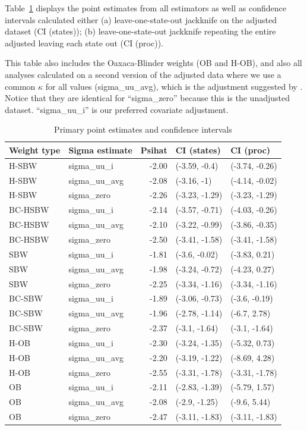 \documentclass[12pt]{article}
\begin{document}
Table~\ref{tab:confintmain} displays the point estimates from all estimators as well as confidence intervals calculated either (a) leave-one-state-out jackknife on the adjusted dataset (CI (states)); (b) leave-one-state-out jackknife repeating the entire adjusted leaving each state out (CI (proc)). 

This table also includes the Oaxaca-Blinder weights (OB and H-OB), and also all analyses calculated on a second version of the adjusted data where we use a common $\kappa$ for all values (sigma\_uu\_avg), which is the adjustment suggested by \cite{carroll2006measurement}. Notice that they are identical for ``sigma\_zero'' because this is the unadjusted dataset. ``sigma\_uu\_i'' is our preferred covariate adjustment.

\begin{table}[ht]
\centering
\begin{tabular}{llrll}
  \toprule
Weight type & Sigma estimate & Psihat & CI (states) & CI (proc) \\ 
  \midrule
H-SBW & sigma\_uu\_i & -2.00 & (-3.59, -0.4) & (-3.74, -0.26) \\ 
  H-SBW & sigma\_uu\_avg & -2.08 & (-3.16, -1) & (-4.14, -0.02) \\ 
  H-SBW & sigma\_zero & -2.26 & (-3.23, -1.29) & (-3.23, -1.29) \\ 
  BC-HSBW & sigma\_uu\_i & -2.14 & (-3.57, -0.71) & (-4.03, -0.26) \\ 
  BC-HSBW & sigma\_uu\_avg & -2.10 & (-3.22, -0.99) & (-3.86, -0.35) \\ 
  BC-HSBW & sigma\_zero & -2.50 & (-3.41, -1.58) & (-3.41, -1.58) \\ 
  SBW & sigma\_uu\_i & -1.81 & (-3.6, -0.02) & (-3.83, 0.21) \\ 
  SBW & sigma\_uu\_avg & -1.98 & (-3.24, -0.72) & (-4.23, 0.27) \\ 
  SBW & sigma\_zero & -2.25 & (-3.34, -1.16) & (-3.34, -1.16) \\ 
  BC-SBW & sigma\_uu\_i & -1.89 & (-3.06, -0.73) & (-3.6, -0.19) \\ 
  BC-SBW & sigma\_uu\_avg & -1.96 & (-2.78, -1.14) & (-6.7, 2.78) \\ 
  BC-SBW & sigma\_zero & -2.37 & (-3.1, -1.64) & (-3.1, -1.64) \\ 
  H-OB & sigma\_uu\_i & -2.30 & (-3.24, -1.35) & (-5.32, 0.73) \\ 
  H-OB & sigma\_uu\_avg & -2.20 & (-3.19, -1.22) & (-8.69, 4.28) \\ 
  H-OB & sigma\_zero & -2.55 & (-3.31, -1.78) & (-3.31, -1.78) \\ 
  OB & sigma\_uu\_i & -2.11 & (-2.83, -1.39) & (-5.79, 1.57) \\ 
  OB & sigma\_uu\_avg & -2.08 & (-2.9, -1.25) & (-9.6, 5.44) \\ 
  OB & sigma\_zero & -2.47 & (-3.11, -1.83) & (-3.11, -1.83) \\ 
   \bottomrule
\end{tabular}
\caption{Primary point estimates and confidence intervals}
\label{tab:confintmain}
\end{table}
\end{document}
